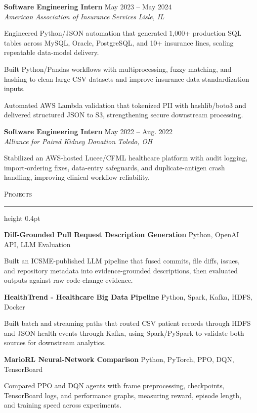 \documentclass[letterpaper,11pt]{article}
\newcommand{\resumesection}[1]{%
  \par\vspace{2pt}%
  {\large\scshape #1}\par\vspace{2pt}%
  \hrule height 0.4pt\vspace{2pt}%
}
\newcommand{\resumeSubheading}[4]{
  \textbf{#1} \hfill #2\\
  \textit{#3} \hfill \textit{#4}
}
\newcommand{\projectHeading}[2]{
  \textbf{#1} \hfill #2
}
\begin{document}
\resumeSubheading
{Software Engineering Intern}{May 2023 -- May 2024}
{American Association of Insurance Services}{Lisle, IL}
\begin{tightitemize}
  \item Engineered Python/JSON automation that generated 1,000+ production SQL tables across MySQL, Oracle, PostgreSQL, and 10+ insurance lines, scaling repeatable data-model delivery.
  \item Built Python/Pandas workflows with multiprocessing, fuzzy matching, and hashing to clean large CSV datasets and improve insurance data-standardization inputs.
  \item Automated AWS Lambda validation that tokenized PII with hashlib/boto3 and delivered structured JSON to S3, strengthening secure downstream processing.
\end{tightitemize}

\resumeSubheading
{Software Engineering Intern}{May 2022 -- Aug. 2022}
{Alliance for Paired Kidney Donation}{Toledo, OH}
\begin{tightitemize}
  \item Stabilized an AWS-hosted Lucee/CFML healthcare platform with audit logging, import-ordering fixes, data-entry safeguards, and duplicate-antigen crash handling, improving clinical workflow reliability.
\end{tightitemize}

\resumesection{Projects}
\projectHeading{Diff-Grounded Pull Request Description Generation}{Python, OpenAI API, LLM Evaluation}
\begin{tightitemize}
  \item Built an ICSME-published LLM pipeline that fused commits, file diffs, issues, and repository metadata into evidence-grounded descriptions, then evaluated outputs against raw code-change evidence.
\end{tightitemize}

\projectHeading{HealthTrend - Healthcare Big Data Pipeline}{Python, Spark, Kafka, HDFS, Docker}
\begin{tightitemize}
  \item Built batch and streaming paths that routed CSV patient records through HDFS and JSON health events through Kafka, using Spark/PySpark to validate both sources for downstream analytics.
\end{tightitemize}

\projectHeading{MarioRL Neural-Network Comparison}{Python, PyTorch, PPO, DQN, TensorBoard}
\begin{tightitemize}
  \item Compared PPO and DQN agents with frame preprocessing, checkpoints, TensorBoard logs, and performance graphs, measuring reward, episode length, and training speed across experiments.
\end{tightitemize}
\end{document}
